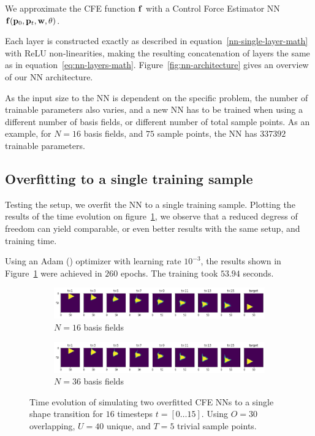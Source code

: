 We approximate the \ac{CFE} function $\vb{f}$ with a Control Force Estimator
\acf{NN} $\vb{f}(\vb{p}_0, \vb{p}_t, \vb{w}, \vb{\theta})$. 

Each layer is constructed exactly as described in
equation~\eqref{nn-single-layer-math} with ReLU non-linearities, making the
resulting concatenation of layers the same as in
equation~\eqref{eq:nn-layers-math}. Figure~\ref{fig:nn-architecture} gives an
overview of our \ac{NN} architecture. 



As the input size to the \ac{NN} is dependent on the specific problem, the
number of trainable parameters also varies, and a new \ac{NN} has to be trained
when using a different number of basis fields, or different number of total
sample points. As an example, for $N=16$ basis fields, and $75$ sample points,
the \ac{NN} has $337 392$ trainable parameters.

\subsection*{Overfitting to a single training sample}
Testing the setup, we overfit the \ac{NN} to a single training sample. Plotting
the results of the time evolution on figure~\ref{fig:NN-overfit}, we observe
that a reduced degress of freedom can yield comparable, or even better results
with the same setup, and training time. 

Using an Adam (\cite{adam}) optimizer with learning rate $10^{-3}$, the results
shown in Figure~\ref{fig:NN-overfit} were achieved in $260$ epochs. The
training took $53.94$ seconds.

\begin{figure}
  \centering
  \begin{subfigure}{\textwidth}
    \centering
    \includegraphics[width=\textwidth]{figures/nn-training/NN_N16_triangle_overfit_horizontal.png}
    \caption{$N=16$ basis fields}
  \end{subfigure}
  \begin{subfigure}{\textwidth}
    \centering
    \includegraphics[width=\textwidth]{figures/nn-training/NN_N36_triangle_overfit_horizontal.png}
    \caption{$N=36$ basis fields}
  \end{subfigure}
  \caption{Time evolution of simulating two overfitted \ac{CFE} \acp{NN} to
  a single shape transition for $16$ timesteps $t=[0\dots15]$. Using $O=30$
overlapping, $U=40$ unique, and $T=5$  trivial sample points.}
  \label{fig:NN-overfit}
\end{figure}


